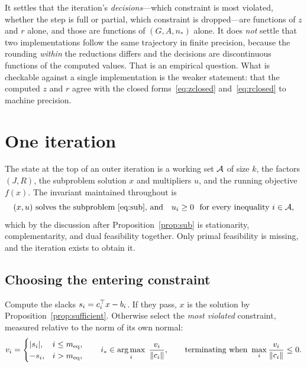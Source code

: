 \begin{remark}
It settles that the iteration's \emph{decisions}---which constraint is most
violated, whether the step is full or partial, which constraint is dropped---are
functions of $z$ and $r$ alone, and those are functions of $(G,A,n_*)$ alone. It
does \emph{not} settle that two implementations follow the same trajectory in
finite precision, because the rounding \emph{within} the reductions differs and the
decisions are discontinuous functions of the computed values. That is an empirical
question. What is checkable against a single implementation is the weaker
statement: that the computed $z$ and $r$ agree with the closed
forms~\eqref{eq:zclosed} and~\eqref{eq:rclosed} to machine precision.
\end{remark}

\section{One iteration}
\label{sec:iteration}

The state at the top of an outer iteration is a working set $\mathcal{A}$ of size $k$,
the factors $(J,R)$, the subproblem solution $x$ and multipliers $u$, and the
running objective $f(x)$. The invariant maintained throughout is
\begin{equation}
  \text{$(x,u)$ solves the subproblem~\eqref{eq:sub}, and}
  \quad u_i \ge 0 \ \text{ for every inequality } i \in \mathcal{A},
  \label{eq:invariant}
\end{equation}
which by the discussion after Proposition~\ref{prop:sub} is stationarity,
complementarity, and dual feasibility together. Only primal feasibility is missing,
and the iteration exists to obtain it.

\subsection{Choosing the entering constraint}

Compute the slacks $s_i = c_i^{\top} x - b_i$. If they pass, $x$ is the solution by
Proposition~\ref{prop:sufficient}. Otherwise select the \emph{most violated}
constraint, measured relative to the norm of its own normal:
\begin{equation}
  v_i = \begin{cases} |s_i|, & i \le m_{\mathrm{eq}},\\ -s_i, & i > m_{\mathrm{eq}},\end{cases}
  \qquad
  i_* \in \operatorname*{arg\,max}_i \; \frac{v_i}{\lVert c_i \rVert},
  \qquad\text{terminating when } \max_i \frac{v_i}{\lVert c_i \rVert} \le 0.
  \label{eq:select}
\end{equation}

